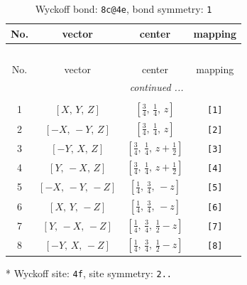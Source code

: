 \documentclass[fleqn,8pt]{jsarticle}
\begin{document}
\renewcommand{\arraystretch}{1.2}
\begin{longtable}{cccc}
\caption{Wyckoff bond: {\tt 8c@4e}, bond symmetry: {\tt 1}}
 \\
 \hline \hline
No. & vector & center & mapping \\ \hline \endfirsthead

\multicolumn{3}{l}{\tablename\ \thetable{}} \\
 \hline \hline
No. & vector & center & mapping \\ \hline \endhead

 \hline \hline
\multicolumn{3}{r}{\footnotesize\it continued ...} \\ \endfoot

 \hline \hline
\multicolumn{3}{r}{} \\ \endlastfoot

1 & $\left[ X,\, Y,\, Z \right]$ & $\left[ \frac{3}{4},\, \frac{1}{4},\, z \right]$ & {\tt [1]} \\ \hline
2 & $\left[ - X,\, - Y,\, Z \right]$ & $\left[ \frac{3}{4},\, \frac{1}{4},\, z \right]$ & {\tt [2]} \\ \hline
3 & $\left[ - Y,\, X,\, Z \right]$ & $\left[ \frac{3}{4},\, \frac{1}{4},\, z + \frac{1}{2} \right]$ & {\tt [3]} \\ \hline
4 & $\left[ Y,\, - X,\, Z \right]$ & $\left[ \frac{3}{4},\, \frac{1}{4},\, z + \frac{1}{2} \right]$ & {\tt [4]} \\ \hline
5 & $\left[ - X,\, - Y,\, - Z \right]$ & $\left[ \frac{1}{4},\, \frac{3}{4},\, - z \right]$ & {\tt [5]} \\ \hline
6 & $\left[ X,\, Y,\, - Z \right]$ & $\left[ \frac{1}{4},\, \frac{3}{4},\, - z \right]$ & {\tt [6]} \\ \hline
7 & $\left[ Y,\, - X,\, - Z \right]$ & $\left[ \frac{1}{4},\, \frac{3}{4},\, \frac{1}{2} - z \right]$ & {\tt [7]} \\ \hline
8 & $\left[ - Y,\, X,\, - Z \right]$ & $\left[ \frac{1}{4},\, \frac{3}{4},\, \frac{1}{2} - z \right]$ & {\tt [8]} \\
\end{longtable}
* Wyckoff site: {\tt 4f}, site symmetry: {\tt 2..}
\renewcommand{\arraystretch}{1.2}
\end{document}
